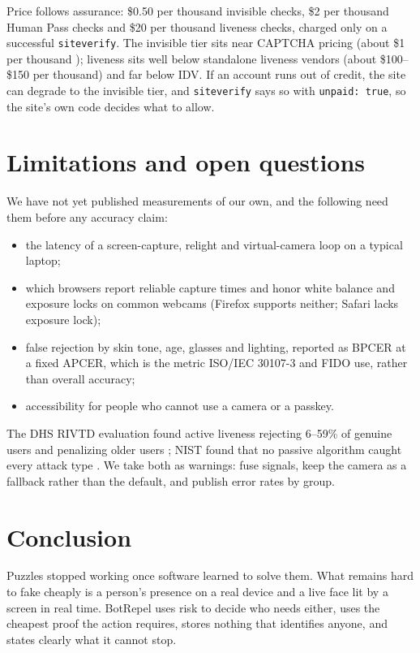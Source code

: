 \documentclass[11pt]{article}
\begin{document}
Price follows assurance: \$0.50 per thousand invisible checks, \$2 per thousand Human Pass checks
and \$20 per thousand liveness checks, charged only on a successful \texttt{siteverify}. The
invisible tier sits near CAPTCHA pricing (about \$1 per thousand \cite{pricing}); liveness sits
well below standalone liveness vendors (about \$100--\$150 per thousand) and far below IDV. If an
account runs out of credit, the site can degrade to the invisible tier, and \texttt{siteverify}
says so with \texttt{unpaid: true}, so the site's own code decides what to allow.

\section{Limitations and open questions}

We have not yet published measurements of our own, and the following need them before any
accuracy claim:
\begin{itemize}
  \item the latency of a screen-capture, relight and virtual-camera loop on a typical laptop;
  \item which browsers report reliable capture times and honor white balance and exposure locks
        on common webcams (Firefox supports neither; Safari lacks exposure lock);
  \item false rejection by skin tone, age, glasses and lighting, reported as BPCER at a fixed
        APCER, which is the metric ISO/IEC 30107-3 and FIDO use, rather than overall accuracy;
  \item accessibility for people who cannot use a camera or a passkey.
\end{itemize}
The DHS RIVTD evaluation found active liveness rejecting 6--59\% of genuine users and penalizing
older users \cite{rivtd}; NIST found that no passive algorithm caught every attack type
\cite{nist8491}. We take both as warnings: fuse signals, keep the camera as a fallback rather than
the default, and publish error rates by group.

\section{Conclusion}

Puzzles stopped working once software learned to solve them. What remains hard to fake cheaply is
a person's presence on a real device and a live face lit by a screen in real time. BotRepel
uses risk to decide who needs either, uses the cheapest proof the action requires, stores nothing
that identifies anyone, and states clearly what it cannot stop.
\end{document}
